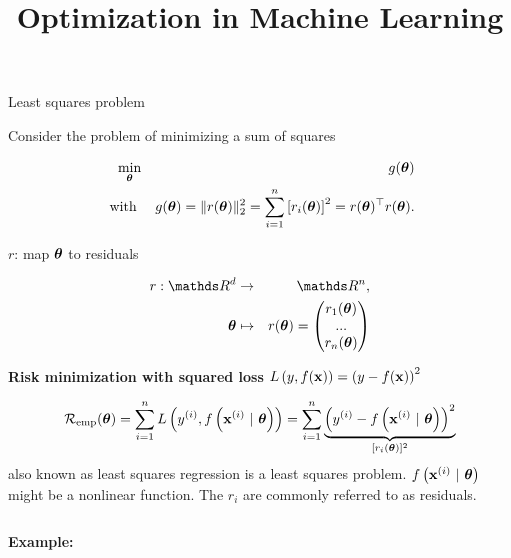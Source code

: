 \documentclass[11pt,compress,t,notes=noshow, xcolor=table]{beamer}
\title{Optimization in Machine Learning}
\date{}
\begin{document}
\sloppy

\begin{vbframe}{Least squares problem}


Consider the problem of minimizing a sum of squares

\begin{eqnarray*}
	\min_{\bm{\theta}} &&g(\bm{\theta})  \\ \text{ with } && g(\bm{\theta}) = \|r(\bm{\theta})\|_2^2 = \sum_{i = 1}^n \left[r_i(\bm{\theta})\right]^2 = r(\bm{\theta})^\top r(\bm{\theta}). 
\end{eqnarray*}

$r$: map $\bm{\theta}$ to residuals

\begin{eqnarray*}
	r: \R^d &\to& \R^n, \\
	\thetab &\mapsto& r(\thetab) = \begin{pmatrix} r_1(\thetab) \\ ... \\ r_n(\thetab)\end{pmatrix}
\end{eqnarray*}

\framebreak 

\textbf{Risk minimization with squared loss} $L\left(y, f(\mathbf{x})\right) = \left(y - f(\mathbf{x})\right)^2$

$$
	\risket = \sumin \Lxyit = \sumin \underbrace{\left(\yi - \fxit \right)^2}_{[r_i(\thetab)]^2} %
$$
also known as least squares regression is a least squares problem. $f\left(\mathbf{x}^{(i)} ~|~ \bm{\theta}\right)$ might be a nonlinear function. The $r_i$ are commonly referred to as residuals.

\vspace*{0.3cm} 

\begin{columns}
\begin{column}{0.55\textwidth}
\textbf{Example:} 


\end{column}
\end{columns}
\end{vbframe}
\end{document}

